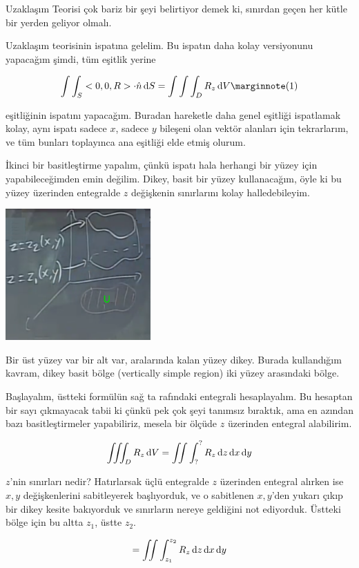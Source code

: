 \documentclass[12pt,fleqn]{article}\usepackage{../../common}
\begin{document}
Uzaklaşım Teorisi çok bariz bir şeyi belirtiyor demek ki, sınırdan geçen
her kütle bir yerden geliyor olmalı.

Uzaklaşım teorisinin ispatına gelelim. Bu ispatın daha kolay versiyonunu
yapacağım şimdi, tüm eşitlik yerine

$$
\int \int_S < 0,0,R > \cdot \hat{n} \ud S =
\int \int \int_D R_z \ud V
\mlabel{1}
$$

eşitliğinin ispatını yapacağım. Buradan hareketle daha genel eşitliği
ispatlamak kolay, aynı ispatı sadece $x$, sadece $y$ bileşeni olan
vektör alanları için tekrarlarım, ve tüm bunları toplayınca ana eşitliği
elde etmiş olurum.

İkinci bir basitleştirme yapalım, çünkü ispatı hala herhangi bir yüzey için
yapabileceğimden emin değilim. Dikey, basit bir yüzey kullanacağım, öyle ki
bu yüzey üzerinden entegralde $z$ değişkenin sınırlarını kolay halledebileyim.

\includegraphics[width=15em]{calc_multi_29_01.png}

Bir üst yüzey var bir alt var, aralarında kalan yüzey dikey. Burada kullandığım
kavram, dikey basit bölge (vertically simple region) iki yüzey arasındaki bölge.

Başlayalım, üstteki formülün sağ ta rafındaki entegrali hesaplayalım. Bu
hesaptan bir sayı çıkmayacak tabii ki çünkü pek çok şeyi tanımsız bıraktık, ama
en azından bazı basitleştirmeler yapabiliriz, mesela bir ölçüde $z$ üzerinden
entegral alabilirim. 

$$
\iiint_D R_z \,\mathrm{d} V = \iint \int_?^? R_z \,\mathrm{d} z \,\mathrm{d} x \,\mathrm{d} y
$$

$z$'nin sınırları nedir? Hatırlarsak üçlü entegralde $z$ üzerinden entegral
alırken ise $x,y$ değişkenlerini sabitleyerek başlıyorduk, ve o sabitlenen
$x,y$'den yukarı çıkıp bir dikey kesite bakıyorduk ve sınırların nereye
geldiğini not ediyorduk. Üstteki bölge için bu altta $z_1$, üstte $z_2$. 

$$
= \iint \int_{z_1}^{z_2} R_z \,\mathrm{d} z \,\mathrm{d} x \,\mathrm{d} y
$$
\end{document}
